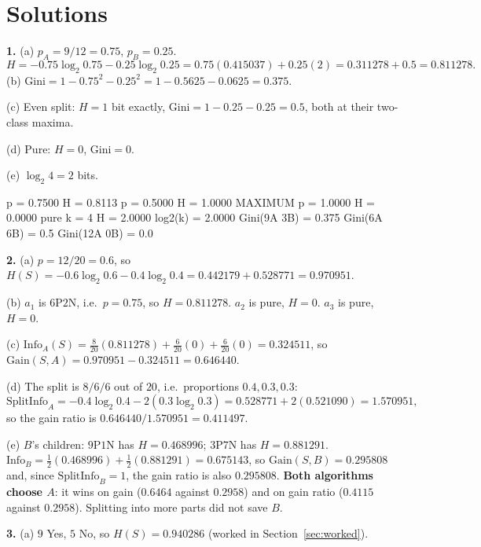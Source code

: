 \documentclass[11pt]{article}
\begin{document}
\section{Solutions}
\label{sec:solutions}

\textbf{1.} (a) $p_A = 9/12 = 0.75$, $p_B = 0.25$.
\[
  H = -0.75\log_2 0.75 - 0.25\log_2 0.25
    = 0.75(0.415037) + 0.25(2) = 0.311278 + 0.5 = 0.811278 .
\]
(b) $\mathrm{Gini} = 1 - 0.75^2 - 0.25^2 = 1 - 0.5625 - 0.0625 = 0.375$.

(c) Even split: $H = 1$ bit exactly, $\mathrm{Gini} = 1 - 0.25 - 0.25 = 0.5$,
both at their two-class maxima.

(d) Pure: $H = 0$, $\mathrm{Gini} = 0$.

(e) $\log_2 4 = 2$ bits.

\begin{codeout}
   p = 0.7500    H = 0.8113
   p = 0.5000    H = 1.0000  MAXIMUM
   p = 1.0000    H = 0.0000  pure
   k =  4   H = 2.0000   log2(k) = 2.0000
Gini(9A 3B) = 0.375   Gini(6A 6B) = 0.5   Gini(12A 0B) = 0.0
\end{codeout}

\medskip
\textbf{2.} (a) $p = 12/20 = 0.6$, so
$H(S) = -0.6\log_2 0.6 - 0.4\log_2 0.4 = 0.442179 + 0.528771 = 0.970951$.

(b) $a_1$ is $6$P$2$N, i.e.\ $p = 0.75$, so $H = 0.811278$. $a_2$ is pure,
$H = 0$. $a_3$ is pure, $H = 0$.

(c) $\mathrm{Info}_A(S) = \tfrac{8}{20}(0.811278) + \tfrac{6}{20}(0)
+ \tfrac{6}{20}(0) = 0.324511$, so
$\mathrm{Gain}(S,A) = 0.970951 - 0.324511 = \mathbf{0.646440}$.

(d) The split is $8/6/6$ out of $20$, i.e.\ proportions $0.4, 0.3, 0.3$:
\[
  \mathrm{SplitInfo}_A = -0.4\log_2 0.4 - 2(0.3\log_2 0.3)
   = 0.528771 + 2(0.521090) = 1.570951,
\]
so the gain ratio is $0.646440/1.570951 = \mathbf{0.411497}$.

(e) $B$'s children: $9$P$1$N has $H = 0.468996$; $3$P$7$N has $H = 0.881291$.
$\mathrm{Info}_B = \tfrac12(0.468996) + \tfrac12(0.881291) = 0.675143$, so
$\mathrm{Gain}(S,B) = 0.295808$ and, since $\mathrm{SplitInfo}_B = 1$, the
gain ratio is also $0.295808$. \textbf{Both algorithms choose $A$}: it wins on
gain ($0.6464$ against $0.2958$) and on gain ratio ($0.4115$ against
$0.2958$). Splitting into more parts did not save $B$.

\medskip
\textbf{3.} (a) $9$ Yes, $5$ No, so $H(S) = 0.940286$ (worked in
Section~\ref{sec:worked}).
\end{document}
